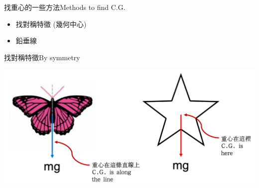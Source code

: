 \documentclass[beamer=true]{standalone}
\begin{document}
\begin{frame}{找重心的一些方法Methods to find C.G.}
    \begin{itemize}
        \item 找對稱特徵 (幾何中心)
        \item 鉛垂線
    \end{itemize}

\end{frame}
\begin{frame}{找對稱特徵By symmetry}
    \par{\par\centering
        \includegraphics[width=\textwidth]{assets/78bde2e5.png}
        \par}
\end{frame}
\end{document}

